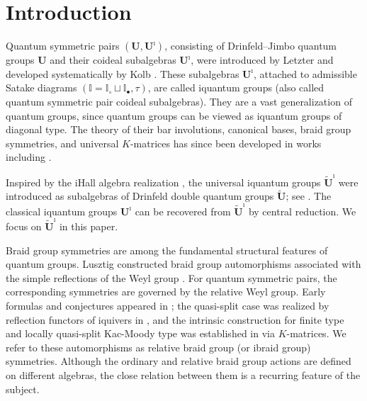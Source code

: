 \documentclass[a4paper,reqno,12pt]{amsart}
\numberwithin{equation}{section}
\theoremstyle{definition}
\theoremstyle{plain}
\theoremstyle{definition}
\def\I{\mathbb I}
\def\bI{\I_\bullet}
\def\wI{\I_\circ}
\def\tU{\widetilde{\mathbf U}}
\def\tUi{\widetilde{\mathbf U}^{\imath}}
\begin{document}
	
	\maketitle
    \setcounter{tocdepth}{1}
	\tableofcontents
	

\section{Introduction}

Quantum symmetric pairs $(\mathbf{U},\mathbf{U}^\imath)$, consisting of Drinfeld--Jimbo quantum groups $\mathbf{U}$ and their coideal subalgebras $\mathbf{U}^\imath$, were introduced by Letzter \cite{Let99,Let02} and developed systematically by Kolb \cite{Ko14}. These subalgebras $\mathbf{U}^\imath$, attached to  admissible Satake diagrams $(\I=\wI\sqcup\bI,\tau)$, are called $\mathrm i$quantum groups (also called quantum symmetric pair coideal subalgebras). They are a vast generalization of quantum groups, since quantum groups can be viewed as iquantum groups of diagonal type. %
The theory of their bar involutions, canonical bases, braid group symmetries, and universal $K$-matrices has since been developed in works including \cite{KP11,BK15,BW18a,BW18b,BK19,AV22,LW21b,WZ23,Z23}. 

Inspired by the iHall algebra realization \cite{LW22a}, the universal iquantum groups $\tUi$ were introduced as subalgebras of Drinfeld double quantum groups $\tU$; see \cite{WZ23}. The classical iquantum groups $\mathbf{U}^\imath$ can be recovered from $\tUi$ by central reduction. We focus on $\tUi$ in this paper.  

Braid group symmetries are among the fundamental structural features of quantum groups.  Lusztig constructed braid group automorphisms associated with the simple reflections of the Weyl group \cite{Lus90,Lus93}.  For quantum symmetric pairs, the corresponding symmetries are governed by the relative Weyl group.  Early formulas and conjectures appeared in \cite{KP11}; the quasi-split case was realized by reflection functors of iquivers in \cite{LW21b}, and the intrinsic construction for finite type and locally quasi-split Kac-Moody type was established in \cite{WZ23,Z23} via $K$-matrices.  We refer to these automorphisms as relative braid group (or ibraid group) symmetries.  Although the ordinary and relative braid group actions are defined on different algebras, the close relation between them is a recurring feature of the subject.
\end{document}
